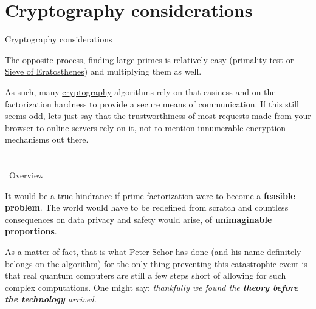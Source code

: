 \documentclass[aspectratio=43]{beamer}
\begin{document}
\section{Cryptography considerations}
\begin{frame}{Cryptography considerations}
    \begin{card}
        The opposite process, finding large primes is relatively easy (\href{https://en.wikipedia.org/wiki/Primality_test}{primality test} or \href{https://en.wikipedia.org/wiki/Sieve_of_Eratosthenes}{Sieve of Eratosthenes}) and multiplying them as well.
    \end{card}
    \begin{card}
        As such, many \href{https://en.wikipedia.org/wiki/Public-key_cryptography}{cryptography} algorithms rely on that easiness and on the factorization hardness to provide a secure means of communication. If this still seems odd, lets just say that the trustworthiness of most requests made from your browser to online servers rely on it, not to mention innumerable encryption mechanisms out there.
    \end{card}
\pagenumber
\end{frame}

\section{\sa}
\begin{frame}{\sa \ Overview}
    \begin{cardTiny}
        It would be a true hindrance if prime factorization were to become a \textbf{feasible problem}. The world would have to be redefined from scratch and countless consequences on data privacy and safety would arise, of \textbf{unimaginable proportions}.
    \end{cardTiny}
    \begin{cardTiny}
        As a matter of fact, that is what Peter Schor has done (and his name definitely belongs on the algorithm) for the only thing preventing this catastrophic event is that real quantum computers are still a few steps short of allowing for such complex computations. One might say: \textit{thankfully we found the \textbf{theory before the technology} arrived.}
    \end{cardTiny}
\pagenumber
\end{frame}
\end{document}
